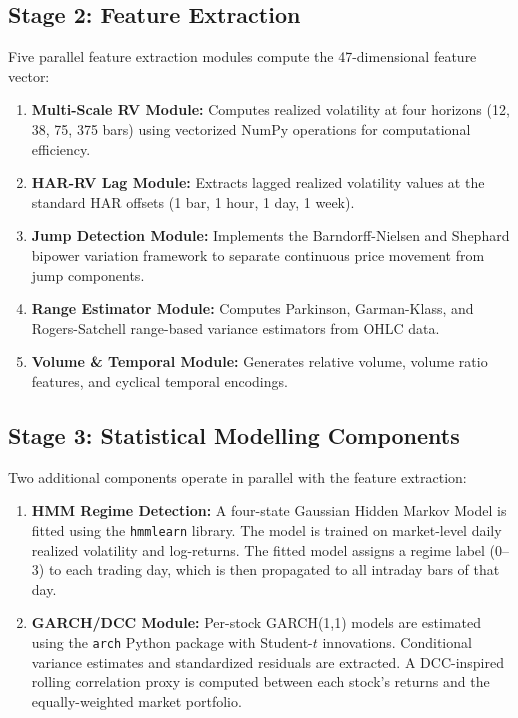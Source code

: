 \subsection{Stage 2: Feature Extraction}

Five parallel feature extraction modules compute the 47-dimensional feature vector:

\begin{enumerate}
    \item \textbf{Multi-Scale RV Module:} Computes realized volatility at four horizons (12, 38, 75, 375 bars) using vectorized NumPy operations for computational efficiency.
    \item \textbf{HAR-RV Lag Module:} Extracts lagged realized volatility values at the standard HAR offsets (1 bar, 1 hour, 1 day, 1 week).
    \item \textbf{Jump Detection Module:} Implements the Barndorff-Nielsen and Shephard bipower variation framework to separate continuous price movement from jump components.
    \item \textbf{Range Estimator Module:} Computes Parkinson, Garman-Klass, and Rogers-Satchell range-based variance estimators from OHLC data.
    \item \textbf{Volume \& Temporal Module:} Generates relative volume, volume ratio features, and cyclical temporal encodings.
\end{enumerate}

\subsection{Stage 3: Statistical Modelling Components}

Two additional components operate in parallel with the feature extraction:

\begin{enumerate}
    \item \textbf{HMM Regime Detection:} A four-state Gaussian Hidden Markov Model is fitted using the \texttt{hmmlearn} library. The model is trained on market-level daily realized volatility and log-returns. The fitted model assigns a regime label (0--3) to each trading day, which is then propagated to all intraday bars of that day.

    \item \textbf{GARCH/DCC Module:} Per-stock GARCH(1,1) models are estimated using the \texttt{arch} Python package with Student-$t$ innovations. Conditional variance estimates and standardized residuals are extracted. A DCC-inspired rolling correlation proxy is computed between each stock's returns and the equally-weighted market portfolio.
\end{enumerate}

